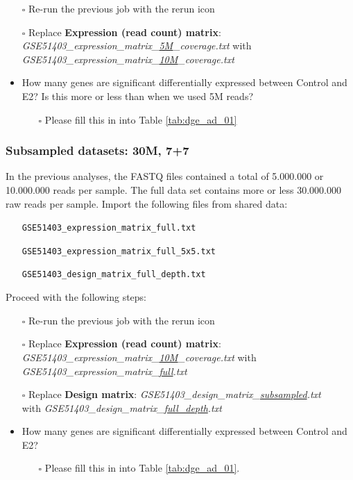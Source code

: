 \begin{itemize}
	\item [$\square$] Re-run the previous job with the rerun icon
	\item [$\square$] Replace \textbf{Expression (read count) matrix}: \textit{GSE51403\_expression\_matrix\_\underline{5M}\_coverage.txt} with \textit{GSE51403\_expression\_matrix\_\underline{10M}\_coverage.txt}
	\item How many genes are significant differentially expressed between Control and E2? Is this more or less than when we used 5M reads?
	\begin{itemize}
		\item[$\square$] Please fill this in into Table \ref{tab:dge_ad_01}
	\end{itemize}
\end{itemize}

\subsubsection{Subsampled datasets: 30M, 7+7}
In the previous analyses, the FASTQ files contained a total of 5.000.000 or 10.000.000 reads per sample. The full data set contains more or less 30.000.000 raw reads per sample. Import the following files from shared data:

\begin{itemize}
	\item[] \verb|GSE51403_expression_matrix_full.txt|
	\item[] \verb|GSE51403_expression_matrix_full_5x5.txt|
	\item[] \verb|GSE51403_design_matrix_full_depth.txt|
\end{itemize}
Proceed with the following steps:
\begin{itemize}
	\item [$\square$] Re-run the previous job with the rerun icon
	\item [$\square$] Replace \textbf{Expression (read count) matrix}: \textit{GSE51403\_expression\_matrix\_\underline{10M}\_coverage.txt} with \textit{GSE51403\_expression\_matrix\_\underline{full}.txt}
	\item [$\square$] Replace \textbf{Design matrix}: \textit{GSE51403\_design\_matrix\_\underline{subsampled}.txt} \\
	 with \textit{GSE51403\_design\_matrix\_\underline{full\_depth}.txt}
	\item How many genes are significant differentially expressed between Control and E2?
	\begin{itemize}
		\item[$\square$] Please fill this in into Table \ref{tab:dge_ad_01}.
	\end{itemize}
\end{itemize}

